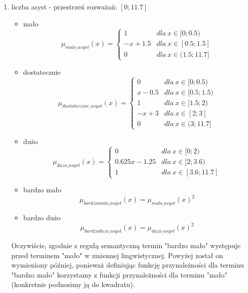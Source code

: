 \documentclass{classrep}
\begin{document}
\begin{enumerate}
    \item liczba asyst - przestrzeń rozważań: $[0;11.7]$
    \begin{itemize}
        \item mało
        \begin{equation}
            \mu_{malo\_asyst}(x) = \left\{\begin{matrix} 1 & dla \: x\in[0;0.5) \\ -x + 1.5 & dla \: x\in [0.5; 1.5] \\ 0 & dla \: x\in (1.5; 11.7] \end{matrix}\right.
        \end{equation}
         \item dostatecznie
        \begin{equation}
            \mu_{dostatecznie\_asyst}(x) = \left\{\begin{matrix}0 & dla \: x\in [0; 0.5) \\ x - 0.5 & dla \: x\in[0.5;1.5) \\ 1 & dla \: x\in [1.5; 2) \\ -x + 3 & dla \: x\in [2;3] \\ 0 & dla \: x\in (3; 11.7] \end{matrix}\right.
        \end{equation}
        \item dużo
        \begin{equation}
            \mu_{duzo\_asyst}(x) = \left\{\begin{matrix}0 & dla \: x\in [0; 2) \\ 0.625x - 1.25 & dla \: x\in[2;3.6) \\ 1 & dla \: x\in [3.6; 11.7] \end{matrix}\right.
        \end{equation}
        \item bardzo mało
        \begin{equation}
            \mu_{bardzomalo\_asyst}(x) = \mu_{malo\_asyst}(x)^2
        \end{equation}
        \item bardzo dużo
        \begin{equation}
            \mu_{bardzoduzo\_asyst}(x) = \mu_{duzo\_asyst}(x)^2
        \end{equation}
    \end{itemize}
    Oczywiście, zgodnie z regułą semantyczną termin "bardzo mało" występuje przed terminem "mało" w zmiennej lingwistycznej. Powyżej został on wymieniony później, ponieważ definiując funkcję przynależności dla terminu "bardzo mało" korzystamy z funkcji przynależności dla terminu "mało" (konkretnie podnosimy ją do kwadratu).

\end{enumerate}
\end{document}
